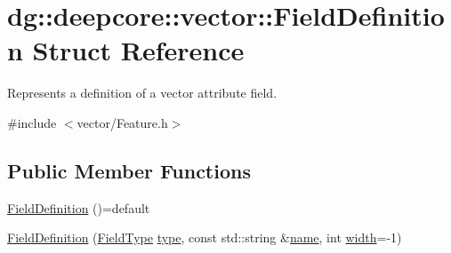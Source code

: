 \hypertarget{structdg_1_1deepcore_1_1vector_1_1_field_definition}{}\section{dg\+:\+:deepcore\+:\+:vector\+:\+:Field\+Definition Struct Reference}
\label{structdg_1_1deepcore_1_1vector_1_1_field_definition}


Represents a definition of a vector attribute field.  




{\ttfamily \#include $<$vector/\+Feature.\+h$>$}

\subsection*{Public Member Functions}
\begin{DoxyCompactItemize}
\item 
\hyperlink{structdg_1_1deepcore_1_1vector_1_1_field_definition_a66655d2ec495781c6c6a913d4e8bb560}{Field\+Definition} ()=default
\item 
\hyperlink{structdg_1_1deepcore_1_1vector_1_1_field_definition_a92e616a840d05c28632c3013b319b699}{Field\+Definition} (\hyperlink{group___vector_module_gaedcee2e418daac47dd4516efa9a0b99d}{Field\+Type} \hyperlink{structdg_1_1deepcore_1_1vector_1_1_field_definition_a50e975eabe1343b91e398322cc990aea}{type}, const std\+::string \&\hyperlink{structdg_1_1deepcore_1_1vector_1_1_field_definition_afe210a024b6230d92260b73d4b0354b9}{name}, int \hyperlink{structdg_1_1deepcore_1_1vector_1_1_field_definition_ae8230841926a1f3c2800397adad755d4}{width}=-\/1)
\end{DoxyCompactItemize}
